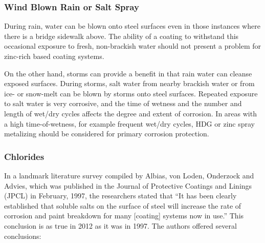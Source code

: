 \subsubsection{Wind Blown Rain or Salt Spray}
During rain, water can be blown onto steel surfaces even in those instances where there is a bridge sidewalk
above. The ability of a coating to withstand this occasional exposure to fresh, non-brackish water should not present
a problem for zinc-rich based coating systems.

On the other hand, storms can provide a benefit in that rain water can cleanse exposed surfaces. During storms,
salt water from nearby brackish water or from ice- or snow-melt can be blown by storms onto steel surfaces.
Repeated exposure to salt water is very corrosive, and the time of wetness and the number and length of wet/dry cycles affects the degree and extent of corrosion. In areas with a high time-of-wetness, for example frequent wet/dry
cycles, HDG or zinc spray metalizing should be considered for primary corrosion protection.

\subsubsection{Chlorides}
In a landmark literature survey compiled by Albias, von Loden, Onderzock and Advies, which was published in
the Journal of Protective Coatings and Linings (JPCL) in February, 1997, the researchers stated that “It has been
clearly established that soluble salts on the surface of steel will increase the rate of corrosion and paint breakdown for
many [coating] systems now in use.” This conclusion is as true in 2012 as it was in 1997. The authors offered
several conclusions:

